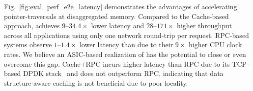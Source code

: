  Fig.~\ref{fig:eval_perf_e2e_latency} demonstrates the advantages of accelerating pointer-traversals at disaggregated memory. Compared to the Cache-based approach, \pulse achieves $9$--$34.4\times$ lower latency and $28$--$171\times$ higher throughput across all applications using only one network round-trip per request. RPC-based systems observe $1$--$1.4\times$ lower latency than \pulse due to their $9\times$ higher CPU clock rates. We believe an ASIC-based realization of \pulse has the potential to close or even overcome this gap. Cache$+$RPC incurs higher latency than RPC due to its TCP-based DPDK stack~\cite{ousterhout_shenango_19_nsdi, aifm} and does not outperform RPC, indicating that data structure-aware caching is not beneficial due to poor locality.

